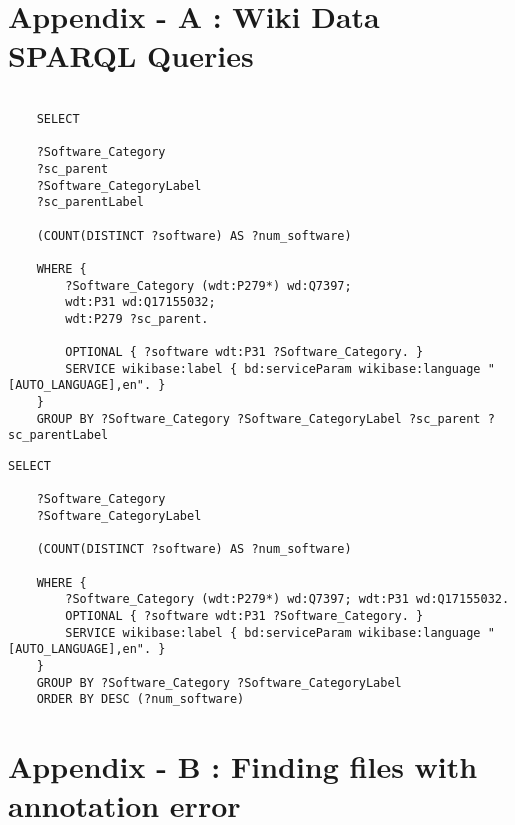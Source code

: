 \chapter{Appendix - A : Wiki Data SPARQL Queries}
\label{ch:classicthesis}
\begin{lstlisting}[language=SPARQL,frame=tb,caption={SARQL Query for software categories},label=lst:useless]
	
	SELECT 
	
	?Software_Category 
	?sc_parent 
	?Software_CategoryLabel 
	?sc_parentLabel 
	
	(COUNT(DISTINCT ?software) AS ?num_software) 
	
	WHERE {	
		?Software_Category (wdt:P279*) wd:Q7397;
		wdt:P31 wd:Q17155032;
		wdt:P279 ?sc_parent.
		
		OPTIONAL { ?software wdt:P31 ?Software_Category. }
		SERVICE wikibase:label { bd:serviceParam wikibase:language "[AUTO_LANGUAGE],en". }
	}
	GROUP BY ?Software_Category ?Software_CategoryLabel ?sc_parent ?sc_parentLabel

\end{lstlisting}

\begin{lstlisting}[language=SPARQL,frame=tb,caption={SPARQL query of software counts in each category},label=lst:useless]
	SELECT 
	
	?Software_Category 
	?Software_CategoryLabel 
	
	(COUNT(DISTINCT ?software) AS ?num_software) 
	
	WHERE {	
		?Software_Category (wdt:P279*) wd:Q7397; wdt:P31 wd:Q17155032.
		OPTIONAL { ?software wdt:P31 ?Software_Category. }
		SERVICE wikibase:label { bd:serviceParam wikibase:language "[AUTO_LANGUAGE],en". }
	}
	GROUP BY ?Software_Category ?Software_CategoryLabel
	ORDER BY DESC (?num_software)
\end{lstlisting}



\chapter{Appendix - B : Finding files with annotation error}
\label{ch:datasplit}

